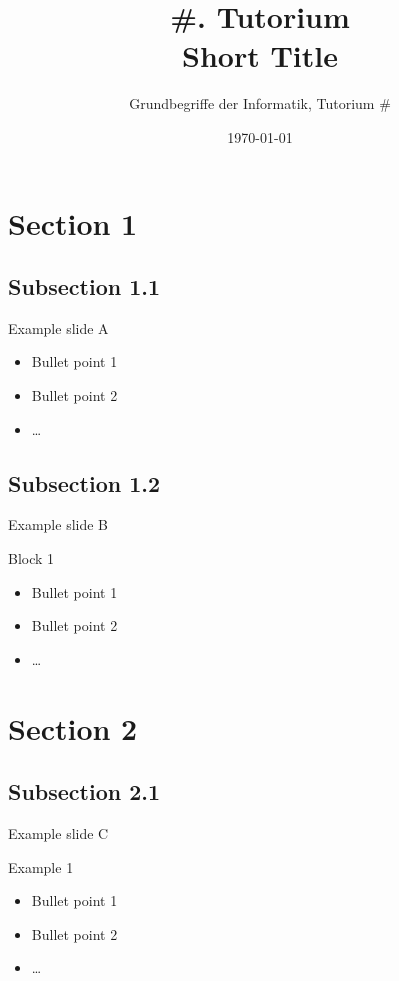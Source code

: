 



\title[Short Title]{\#. Tutorium\\ Short Title}
\subtitle{Grundbegriffe der Informatik, Tutorium \#\mytutnumber}
\date{\today}


\titleframe
\roadmap

\section{Section 1}
\subsection{Subsection 1.1}
\begin{frame}{Example slide A}
\begin{itemize}
\item Bullet point 1
\pause
\item Bullet point 2
\item \dots
\end{itemize}
\end{frame}

\subsection{Subsection 1.2}
\begin{frame}{Example slide B}
\begin{block}{Block 1}
\begin{itemize}
\item Bullet point 1
\pause
\item Bullet point 2
\item \dots
\end{itemize}
\end{block}
\end{frame}

\section{Section 2}
\subsection{Subsection 2.1}
\begin{frame}{Example slide C}
\begin{exampleblock}{Example 1}
\begin{itemize}
\item Bullet point 1
\pause
\item Bullet point 2
\item \dots
\end{itemize}
\end{exampleblock}
\end{frame}

